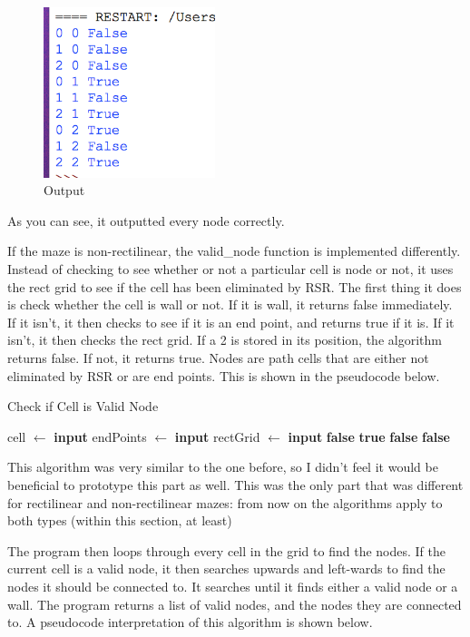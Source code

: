 \documentclass[titlepage]{article}
\begin{document}
\begin{figure}[H]
  \centering
  \includegraphics[width=5cm]{nbrout.png}
  \caption{Output}
  \label{fig:dijk}
\end{figure}

As you can see, it outputted every node correctly.

If the maze is non-rectilinear, the valid\_node function is implemented differently. Instead of checking to see whether or not a particular cell is node or not, it uses the rect grid to see if the cell has been eliminated by RSR. The first thing it does is check whether the cell is wall or not. If it is wall, it returns false immediately. If it isn't, it then checks to see if it is an end point, and returns true if it is. If it isn't, it then checks the rect grid. If a 2 is stored in its position, the algorithm returns false. If not, it returns true. Nodes are path cells that are either not eliminated by RSR or are end points. This is shown in the pseudocode below.

\begin{algorithm}[H]
\caption{Check if Cell is Valid Node}
\begin{algorithmic}[1]
    	\State cell $\gets$ \textbf{input}
    	\State endPoints $\gets$ \textbf{input}
    	\State rectGrid $\gets$ \textbf{input}
		\State \Return \textbf{false}
		\State \Return \textbf{true}
		\State \Return \textbf{false}
	\EndIf
	\State \Return \textbf{false}
\end{algorithmic}
\end{algorithm}

This algorithm was very similar to the one before, so I didn't feel it would be beneficial to prototype this part as well. This was the only part that was different for rectilinear and non-rectilinear mazes: from now on the algorithms apply to both types (within this section, at least)

The program then loops through every cell in the grid to find the nodes. If the current cell is a valid node, it then searches upwards and left-wards to find the nodes it should be connected to. It searches until it finds either a valid node or a wall. The program returns a list of valid nodes, and the nodes they are connected to. A pseudocode interpretation of this algorithm is shown below. 
\end{document}
